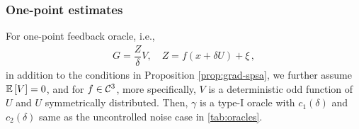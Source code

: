 \subsubsection*{One-point estimates}
\begin{proposition}
\label{prop:grad-onepoint}
For one-point feedback oracle, i.e.,
\begin{align*}
G = \dfrac{Z}{\delta}V, \quad Z=f(x+\delta U)+\xi\,,
\end{align*}
in addition to the conditions in Proposition \ref{prop:grad-spsa}, we further assume $\mathbb{E}\left[V\right]=0$, and for $f \in \mathcal{C}^3$, more specifically, $V$ is a deterministic odd function of $U$ and $U$ symmetrically distributed. Then, $\gamma$ is a type-I oracle with $c_1(\delta)$ and $c_2(\delta)$ same as the uncontrolled noise case in \cref{tab:oracles}.
\end{proposition}


